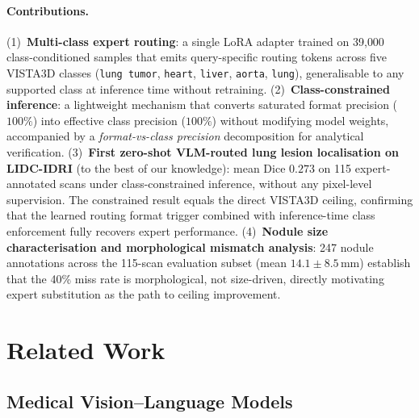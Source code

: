 \documentclass[lineno,referee,pdflatex,sn-mathphys-num]{sn-jnl}
\begin{document}
\paragraph{Contributions.}
(1)~\textbf{Multi-class expert routing}: a single LoRA adapter trained on
39{,}000 class-conditioned samples that emits query-specific routing tokens
across five VISTA3D classes (\texttt{lung tumor}, \texttt{heart},
\texttt{liver}, \texttt{aorta}, \texttt{lung}), generalisable to any
supported class at inference time without retraining.
(2)~\textbf{Class-constrained inference}: a lightweight mechanism that
converts saturated format precision ($100\%$) into effective class precision
($100\%$) without modifying model weights, accompanied by a
\emph{format-vs-class precision} decomposition for analytical verification.
(3)~\textbf{First zero-shot VLM-routed lung lesion localisation on
LIDC-IDRI} (to the best of our knowledge): mean Dice $0.273$ on
115 expert-annotated scans under class-constrained inference, without any
pixel-level supervision. The constrained result equals the direct VISTA3D
ceiling, confirming that the learned routing format trigger combined with
inference-time class enforcement fully recovers expert performance.
(4)~\textbf{Nodule size characterisation and morphological mismatch
analysis}: 247 nodule annotations across the 115-scan evaluation subset
(mean $14.1\pm8.5$\,mm) establish that the 40\% miss rate is
morphological, not size-driven, directly motivating expert substitution
as the path to ceiling improvement.


\FloatBarrier
\section{Related Work}
\label{sec:related}

\subsection{Medical Vision--Language Models}
\end{document}
